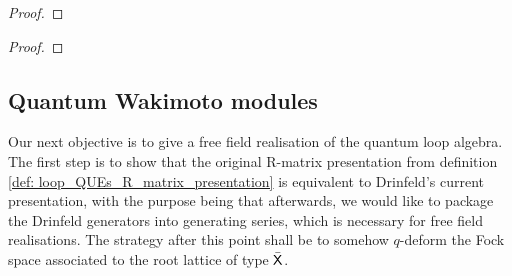         \begin{lemma} \label{lemma: hopf_structure_on_extended_loop_QUEs}
            
        \end{lemma}
            \begin{proof}
                
            \end{proof}
        \begin{corollary} \label{coro: hopf_structure_on_loop_QUEs}
            
        \end{corollary}
            \begin{proof}
                
            \end{proof}

    \subsection{Quantum Wakimoto modules}
        Our next objective is to give a free field realisation of the quantum loop algebra. The first step is to show that the original R-matrix presentation from definition \ref{def: loop_QUEs_R_matrix_presentation} is equivalent to Drinfeld's current presentation, with the purpose being that afterwards, we would like to package the Drinfeld generators into generating series, which is necessary for free field realisations. The strategy after this point shall be to somehow $q$-deform the Fock space associated to the root lattice of type $\bar{\mathsf{X}}$. 
        
